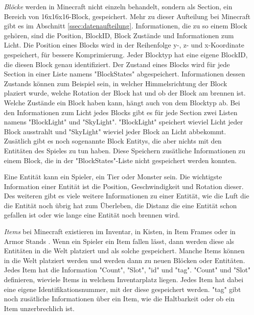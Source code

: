 \textit{Blöcke} werden in Minecraft nicht einzeln behandelt, sondern als Section, ein Bereich von 16x16x16-Block, gespeichert. Mehr zu dieser Aufteilung bei Minecraft gibt es im Abschnitt \ref{ssec:datenaufteilung}. Informationen, die zu so einem Block gehören, sind die Position, BlockID, Block Zustände und Informationen zum Licht. Die Position eines Blocks wird in der Reihenfolge y-, z- und x-Koordinate gespeichert, für bessere Komprimierung. Jeder Blocktyp hat eine eigene BlockID, die diesen Block genau identifiziert. Der Zustand eines Blocks wird für jede Section in einer Liste namens "BlockStates" abgespeichert. Informationen dessen Zustands können zum Beispiel sein, in welcher Himmelsrichtung der Block plaziert wurde, welche Rotation der Block hat und ob der Block am brennen ist. Welche Zustände ein Block haben kann, hängt auch von dem Blocktyp ab.\cite{minecraftBlockStates} Bei den Informationen zum Licht jedes Blocks gibt es für jede Section zwei Listen namens "BlockLight" und "SkyLight". "BlockLight" speichert wieviel Licht jeder Block ausstrahlt und "SkyLight" wieviel jeder Block an Licht abbekommt. Zusätlich gibt es noch sogenannte Block Entitys, die aber nichts mit den Entitäten des Spieles zu tun haben. Diese Speichern zusätliche Informationen zu einem Block, die in der "BlockStates"-Liste nicht gespeichert werden konnten.\cite{minecraftChunkFormat}

Eine Entität kann ein Spieler, ein Tier oder Monster sein. Die wichtigste Information einer Entität ist die Position, Geschwindigkeit und Rotation dieser. Des weiteren gibt es viele weitere Informationen zu einer Entität, wie die Luft die die Entität noch übrig hat zum Überleben, die Distanz die eine Entität schon gefallen ist oder wie lange eine Entität noch brennen wird.\cite{minecraftEntityFormat}


\textit{Items} bei Minecraft existieren im Inventar, in Kisten, in Item Frames oder in Armor Stands . Wenn ein Spieler ein Item fallen lässt, dann werden diese als Entitäten in die Welt platziert und als solche gespeichert. Manche Items können in die Welt platziert werden und werden dann zu neuen Blöcken oder Entitäten. Jedes Item hat die Information "Count", "Slot", "id" und "tag". "Count" und "Slot" definieren, wieviele Items in welchem Inventarplatz liegen. Jedes Item hat dabei eine eigene Identifikationsnummer, mit der diese gespeichert werden. "tag" gibt noch zusätliche Informationen über ein Item, wie die Haltbarkeit oder ob ein Item unzerbrechlich ist.
\cite{minecraftPlayerdatFormat}
\cite{minecraftItem}

